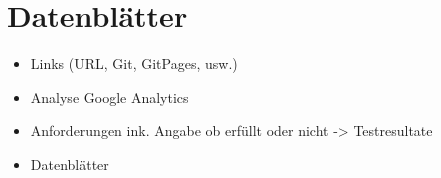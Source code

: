 \section{Datenblätter}

\begin{itemize}
	\item Links (URL, Git, GitPages, usw.)
	\item Analyse Google Analytics
	\item Anforderungen ink. Angabe ob erfüllt oder nicht -> Testresultate
	\item Datenblätter
\end{itemize}
